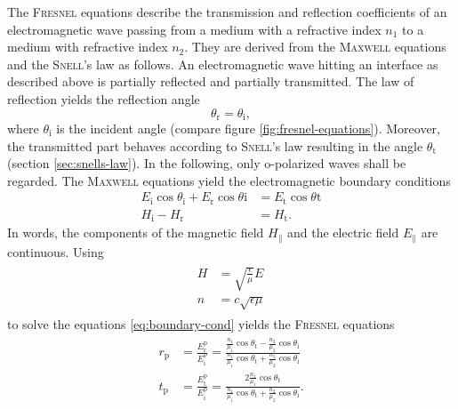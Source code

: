 \documentclass[../thesis.tex]{subfiles}
\begin{document}
        The \textsc{Fresnel} equations describe the transmission and reflection coefficients of an electromagnetic wave passing from a medium with a refractive index $n_1$ to a medium with refractive index $n_2$. They are derived from the \textsc{Maxwell} equations and the \textsc{Snell}'s law as follows. An electromagnetic wave hitting an interface as described above is partially reflected and partially transmitted. The law of reflection yields the reflection angle
        \begin{equation}
            \theta_\mathrm{r} = \theta_\mathrm{i},
        \end{equation}
        where $\theta_\mathrm{i}$ is the incident angle (compare figure \cref{fig:fresnel-equations}). Moreover, the transmitted part behaves according to \textsc{Snell}'s law resulting in the angle $\theta_\mathrm{t}$ (section \cref{sec:snells-law}). In the following, only o-polarized waves shall be regarded. The \textsc{Maxwell} equations yield the electromagnetic boundary conditions
        \begin{equation}
            \begin{split}
                E_\mathrm{i}\cos\theta_\mathrm{i} + E_\mathrm{r}\cos\theta\mathrm{i} &= E_\mathrm{t}\cos\theta\mathrm{t}    \\
                H_\mathrm{i} - H_\mathrm{r} &= H_\mathrm{t}.
                \label{eq:boundary-cond}
            \end{split}
        \end{equation}
        In words, the components of the magnetic field $H_\parallel$ and the electric field $E_\parallel$ are continuous. Using
        \begin{align}
            \begin{split}
                H&=\sqrt{\frac{\epsilon}{\mu}}E \\
                n&=c\sqrt{\epsilon\mu}
            \end{split}
            \label{eq:boundary-cond}
        \end{align}
        to solve the equations \cref{eq:boundary-cond} yields the \textsc{Fresnel} equations
        \begin{align}
            \begin{split}
                r_\mathrm{p} &= \frac{E_\mathrm{r}^\mathrm{p}}{E_\mathrm{i}^\mathrm{p}} = \frac{\frac{n_1}{\mu_1}\cos\theta_\mathrm{t} - \frac{n_2}{\mu_2}\cos\theta_\mathrm{i}}{\frac{n_1}{\mu_1}\cos\theta_\mathrm{t} + \frac{n_2}{\mu_2}\cos\theta_\mathrm{i}} \\
                t_\mathrm{p} &= \frac{E_\mathrm{t}^\mathrm{p}}{E_\mathrm{i}^\mathrm{p}} = \frac{2\frac{n_1}{\mu_1}\cos\theta_\mathrm{t}}{\frac{n_1}{\mu_1}\cos\theta_\mathrm{t} + \frac{n_2}{\mu_2}\cos\theta_\mathrm{i}}.
            \end{split}
            \label{eq:fresnel1}
        \end{align}
\end{document}
